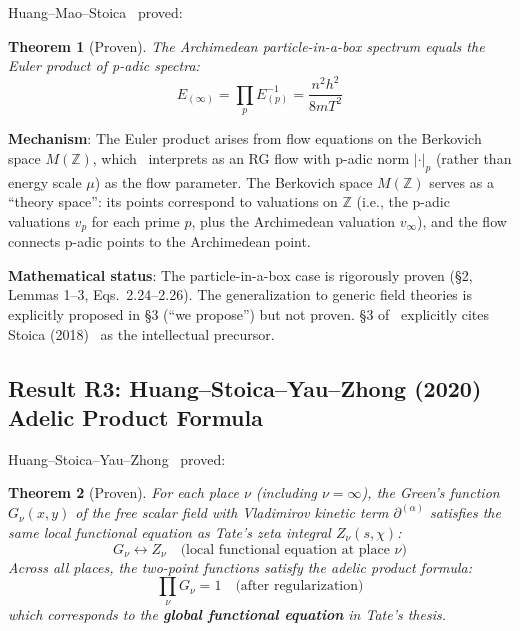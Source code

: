 \documentclass[11pt,a4paper]{article}
\newtheorem{theorem}{Theorem}
\newcommand{\dpartial}{\partial^{(\alpha)}}
\begin{document}
Huang--Mao--Stoica~\cite{HMS20} proved:

\begin{theorem}[Proven]
The Archimedean particle-in-a-box spectrum equals the Euler product of p-adic spectra:
\begin{equation}
E_{(\infty)} = \prod_p E_{(p)}^{-1} = \frac{n^2 h^2}{8 m T^2}
\end{equation}
\end{theorem}

\textbf{Mechanism}: The Euler product arises from flow equations on the Berkovich space $M(\mathbb{Z})$, which~\cite{HMS20} interprets as an RG flow with p-adic norm $|\cdot|_p$ (rather than energy scale $\mu$) as the flow parameter. The Berkovich space $M(\mathbb{Z})$ serves as a ``theory space'': its points correspond to valuations on $\mathbb{Z}$ (i.e., the p-adic valuations $v_p$ for each prime $p$, plus the Archimedean valuation $v_\infty$), and the flow connects p-adic points to the Archimedean point.

\textbf{Mathematical status}: The particle-in-a-box case is rigorously proven (\S2, Lemmas 1--3, Eqs.~2.24--2.26). The generalization to generic field theories is explicitly proposed in \S3 (``we propose'') but not proven. \S3 of~\cite{HMS20} explicitly cites Stoica (2018)~\cite{S18} as the intellectual precursor.

\subsection{Result R3: Huang--Stoica--Yau--Zhong (2020) Adelic Product Formula}
\label{sec:adelic-green}

Huang--Stoica--Yau--Zhong~\cite{HSYZ20} proved:

\begin{theorem}[Proven]
For each place $\nu$ (including $\nu = \infty$), the Green's function $G_\nu(x,y)$ of the free scalar field with Vladimirov kinetic term $\dpartial$ satisfies the same local functional equation as Tate's zeta integral $Z_\nu(s, \chi)$:
\begin{equation}
G_\nu \leftrightarrow Z_\nu \quad \text{(local functional equation at place } \nu\text{)}
\end{equation}
Across all places, the two-point functions satisfy the adelic product formula:
\begin{equation}
\prod_\nu G_\nu = 1 \quad \text{(after regularization)}
\end{equation}
which corresponds to the \textbf{global functional equation} in Tate's thesis.
\end{theorem}
\end{document}
